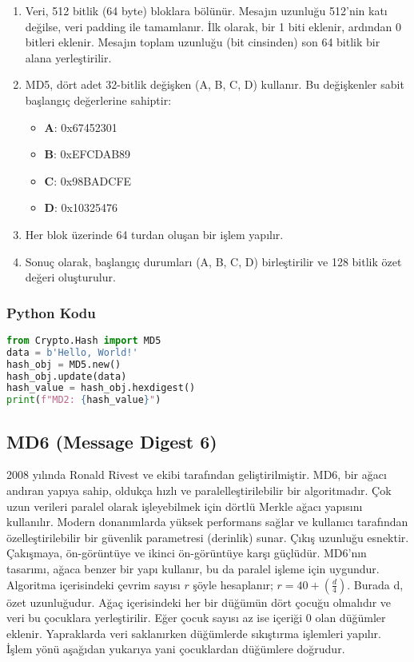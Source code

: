 \begin{enumerate}
    \item Veri, 512 bitlik (64 byte) bloklara bölünür. Mesajın uzunluğu 512'nin katı değilse, veri padding ile tamamlanır. İlk olarak, bir 1 biti eklenir, ardından 0 bitleri eklenir. Mesajın toplam uzunluğu (bit cinsinden) son 64 bitlik bir alana yerleştirilir.
    \item MD5, dört adet 32-bitlik değişken (A, B, C, D) kullanır. Bu değişkenler sabit başlangıç değerlerine sahiptir:
    \begin{itemize}
        \item \textbf{A}: 0x67452301
        \item \textbf{B}: 0xEFCDAB89
        \item \textbf{C}: 0x98BADCFE
        \item \textbf{D}: 0x10325476
    \end{itemize}
    \item Her blok üzerinde 64 turdan oluşan bir işlem yapılır.
    \item Sonuç olarak, başlangıç durumları (A, B, C, D) birleştirilir ve 128 bitlik özet değeri oluşturulur.
\end{enumerate}

\subsubsection{Python Kodu}

\begin{lstlisting}[language=Python]
from Crypto.Hash import MD5
data = b'Hello, World!'
hash_obj = MD5.new()
hash_obj.update(data)
hash_value = hash_obj.hexdigest()
print(f"MD2: {hash_value}")
\end{lstlisting}

\newpage

\subsection{MD6 (Message Digest 6)}

2008 yılında Ronald Rivest ve ekibi tarafından geliştirilmiştir. MD6, bir ağacı andıran yapıya sahip, oldukça hızlı ve paralelleştirilebilir bir algoritmadır. Çok uzun verileri paralel olarak işleyebilmek için dörtlü Merkle ağacı yapısını kullanılır. Modern donanımlarda yüksek performans sağlar ve kullanıcı tarafından özelleştirilebilir bir güvenlik parametresi (derinlik) sunar. Çıkış uzunluğu esnektir. Çakışmaya, ön-görüntüye ve ikinci ön-görüntüye karşı güçlüdür. MD6'nın tasarımı, ağaca benzer bir yapı kullanır, bu da paralel işleme için uygundur. Algoritma içerisindeki çevrim sayısı $r$ şöyle hesaplanır; $r = 40 + (\frac{d}{4})$. Burada d, özet uzunluğudur. Ağaç içerisindeki her bir düğümün dört çocuğu olmalıdır ve veri bu çocuklara yerleştirilir. Eğer çocuk sayısı az ise içeriği 0 olan düğümler eklenir. Yapraklarda veri saklanırken düğümlerde sıkıştırma işlemleri yapılır. İşlem yönü aşağıdan yukarıya yani çocuklardan düğümlere doğrudur. 

